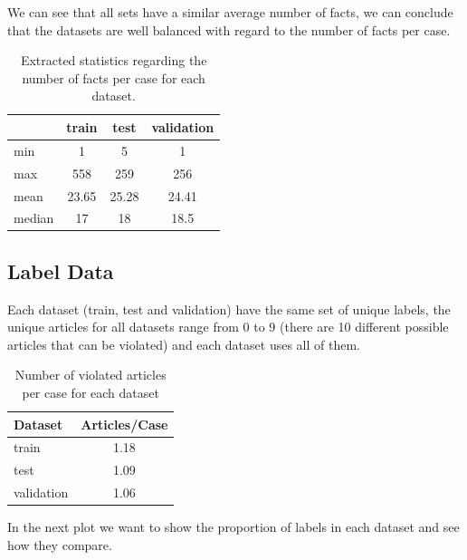 \documentclass{article}
\begin{document}
We can see that all sets have a similar average number of facts, we
can conclude that the datasets are well balanced with regard to the
number of facts per case.
\begin{table}[H]
\centering
\begin{tabular}{|l|c|c|c|}
\hline
\rowcolor[HTML]{C0C0C0} 
\multicolumn{1}{|c|}{\cellcolor[HTML]{C0C0C0}statistic} & train & test & validation \\ \hline
min & 1 & 5 & 1 \\
max & 558 & 259 & 256 \\
mean & 23.65 & 25.28 & 24.41 \\
median & 17 & 18 & 18.5 \\ \hline
\end{tabular}
\caption{Extracted statistics regarding the number of facts per case for each dataset.}
\label{tab: facts per case statistics}
\end{table}

\subsection{Label Data}

Each dataset (train, test and validation) have the same set of unique
labels, the unique articles for all datasets range from 
0 to 9 (there are 10 different possible articles that can be violated) and
each dataset uses all of them.

\begin{table}[H]
\centering
\begin{tabular}{l|c}
Dataset    & Articles/Case \\ \hline
train      & 1.18          \\
test       & 1.09          \\
validation & 1.06         
\end{tabular}
\caption{Number of violated articles per case for each dataset}
\label{tab: articles per case}
\end{table}

In the next plot we want to show the proportion of labels in each 
dataset and see how they compare.
\end{document}
